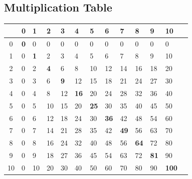 \documentclass[a4paper,11pt ]{book}
\begin{document}
\subsection{Multiplication Table}
\begin{table}[h]
\centering
\begin{tabular}{c| llllllllllll}
   & 0          & 1          & 2          & 3          & 4           & 5           & 6           & 7           & 8           & 9           & 10            \\
   \hline
0  & \textbf{0} & 0          & 0          & 0          & 0           & 0           & 0           & 0           & 0           & 0           & 0             \\
1  & 0          & \textbf{1} & 2          & 3          & 4           & 5           & 6           & 7           & 8           & 9           & 10            \\
2  & 0          & 2          & \textbf{4} & 6          & 8           & 10          & 12          & 14          & 16          & 18          & 20            \\
3  & 0          & 3          & 6          & \textbf{9} & 12          & 15          & 18          & 21          & 24          & 27          & 30            \\
4  & 0          & 4          & 8          & 12         & \textbf{16} & 20          & 24          & 28          & 32          & 36          & 40            \\
5  & 0          & 5          & 10         & 15         & 20          & \textbf{25} & 30          & 35          & 40          & 45          & 50            \\
6  & 0          & 6          & 12         & 18         & 24          & 30          & \textbf{36} & 42          & 48          & 54          & 60            \\
7  & 0          & 7          & 14         & 21         & 28          & 35          & 42          & \textbf{49} & 56          & 63          & 70            \\
8  & 0          & 8          & 16         & 24         & 32          & 40          & 48          & 56          & \textbf{64} & 72          & 80            \\
9  & 0          & 9          & 18         & 27         & 36          & 45          & 54          & 63          & 72          & \textbf{81} & 90            \\
10 & 0          & 10         & 20         & 30         & 40          & 50          & 60          & 70          & 80          & 90          & \textbf{100} 
\end{tabular}
\end{table}
\end{document}
